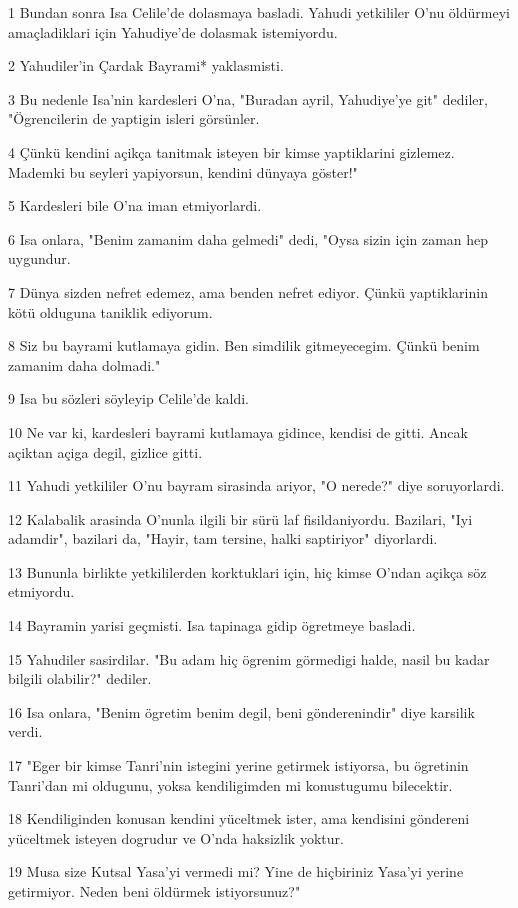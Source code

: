 \par 1 Bundan sonra Isa Celile'de dolasmaya basladi. Yahudi yetkililer O'nu öldürmeyi amaçladiklari için Yahudiye'de dolasmak istemiyordu.
\par 2 Yahudiler'in Çardak Bayrami* yaklasmisti.
\par 3 Bu nedenle Isa'nin kardesleri O'na, "Buradan ayril, Yahudiye'ye git" dediler, "Ögrencilerin de yaptigin isleri görsünler.
\par 4 Çünkü kendini açikça tanitmak isteyen bir kimse yaptiklarini gizlemez. Mademki bu seyleri yapiyorsun, kendini dünyaya göster!"
\par 5 Kardesleri bile O'na iman etmiyorlardi.
\par 6 Isa onlara, "Benim zamanim daha gelmedi" dedi, "Oysa sizin için zaman hep uygundur.
\par 7 Dünya sizden nefret edemez, ama benden nefret ediyor. Çünkü yaptiklarinin kötü olduguna taniklik ediyorum.
\par 8 Siz bu bayrami kutlamaya gidin. Ben simdilik gitmeyecegim. Çünkü benim zamanim daha dolmadi."
\par 9 Isa bu sözleri söyleyip Celile'de kaldi.
\par 10 Ne var ki, kardesleri bayrami kutlamaya gidince, kendisi de gitti. Ancak açiktan açiga degil, gizlice gitti.
\par 11 Yahudi yetkililer O'nu bayram sirasinda ariyor, "O nerede?" diye soruyorlardi.
\par 12 Kalabalik arasinda O'nunla ilgili bir sürü laf fisildaniyordu. Bazilari, "Iyi adamdir", bazilari da, "Hayir, tam tersine, halki saptiriyor" diyorlardi.
\par 13 Bununla birlikte yetkililerden korktuklari için, hiç kimse O'ndan açikça söz etmiyordu.
\par 14 Bayramin yarisi geçmisti. Isa tapinaga gidip ögretmeye basladi.
\par 15 Yahudiler sasirdilar. "Bu adam hiç ögrenim görmedigi halde, nasil bu kadar bilgili olabilir?" dediler.
\par 16 Isa onlara, "Benim ögretim benim degil, beni gönderenindir" diye karsilik verdi.
\par 17 "Eger bir kimse Tanri'nin istegini yerine getirmek istiyorsa, bu ögretinin Tanri'dan mi oldugunu, yoksa kendiligimden mi konustugumu bilecektir.
\par 18 Kendiliginden konusan kendini yüceltmek ister, ama kendisini göndereni yüceltmek isteyen dogrudur ve O'nda haksizlik yoktur.
\par 19 Musa size Kutsal Yasa'yi vermedi mi? Yine de hiçbiriniz Yasa'yi yerine getirmiyor. Neden beni öldürmek istiyorsunuz?"
